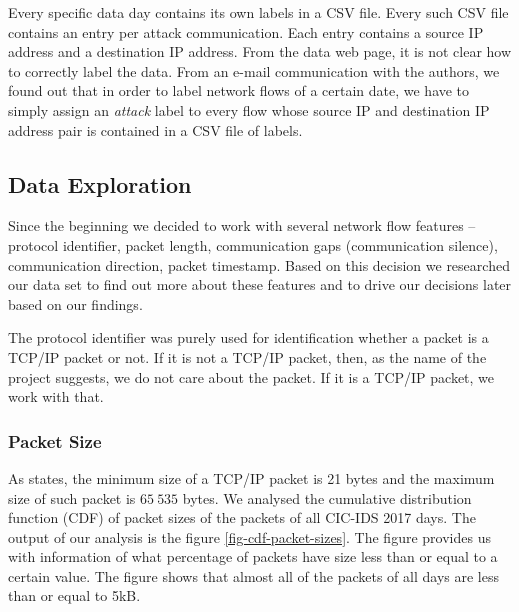 \documentclass{article}
\begin{document}
Every specific data day contains its own labels in a CSV file. Every such CSV file contains an entry per attack communication. Each entry contains a source IP address and a destination IP address. From the data web page, it is not clear how to correctly label the data. From an e-mail communication with the authors, we found out that in order to label network flows of a certain date, we have to simply assign an \textit{attack} label to every flow whose source IP and destination IP address pair is contained in a CSV file of labels.




\subsection{Data Exploration}\label{sec-dataset-exploration}
Since the beginning we decided to work with several network flow features -- protocol identifier, packet length, communication gaps (communication silence), communication direction, packet timestamp. Based on this decision we researched our data set to find out more about these features and to drive our decisions later based on our findings.

The protocol identifier was purely used for identification whether a packet is a TCP/IP packet or not. If it is not a TCP/IP packet, then, as the name of the project suggests, we do not care about the packet. If it is a TCP/IP packet, we work with that.

\subsubsection{Packet Size}
As \cite{oreilly-tcp} states, the minimum size of a TCP/IP packet is 21 bytes and the maximum size of such packet is $65\ 535$ bytes. We analysed the cumulative distribution function (CDF) of packet sizes of the packets of all CIC-IDS 2017 days. The output of our analysis is the figure \ref{fig-cdf-packet-sizes}. The figure provides us with information of what percentage of packets have size less than or equal to a certain value. The figure shows that almost all of the packets of all days are less than or equal to 5kB.
\end{document}
